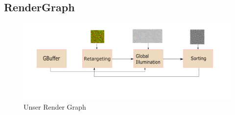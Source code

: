 \subsection{RenderGraph}

\begin{figure}[H]
    \centering
    \includegraphics[width=\linewidth]{content/PathTracer/Bilder/render_graph.png}
    \caption{Unser Render Graph}
    \label{pic::RenderGraph}
\end{figure}




